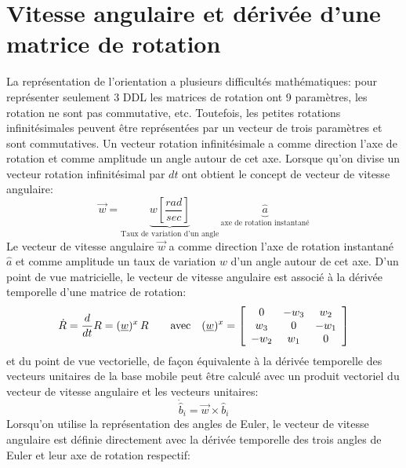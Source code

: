 \newpage
\section{Vitesse angulaire et dérivée d'une matrice de rotation}
\label{sec:angularspeed}

La représentation de l'orientation a plusieurs difficultés mathématiques: pour représenter seulement 3 DDL les matrices de rotation ont 9 paramètres, les rotation ne sont pas commutative, etc. Toutefois, les petites rotations infinitésimales peuvent être représentées par un vecteur de trois paramètres et sont commutatives. Un vecteur rotation infinitésimale a comme direction l'axe de rotation et comme amplitude un angle autour de cet axe. Lorsque qu'on divise un vecteur rotation infinitésimal par $dt$ ont obtient le concept de vecteur de vitesse angulaire:
\begin{equation}
\vec{w} = \underbrace{
w \left[ \frac{rad}{sec} \right] 
}_{\text{Taux de variation d'un angle}}
\,
\underbrace{
\hat{a}
}_{\text{axe de rotation instantané}}
\end{equation}
Le vecteur de vitesse angulaire $\vec{w}$ a comme direction l'axe de rotation instantané  $\hat{a}$ et comme amplitude un taux de variation $w$ d'un angle autour de cet axe. D'un point de vue matricielle, le vecteur de vitesse angulaire est associé à la dérivée temporelle d'une matrice de rotation:
\begin{equation}
\dot{R} = \frac{d}{dt} R = (\underline{w})^x \, R   \quad \quad \text{avec} \quad
(\underline{w})^x = 
\left[ \begin{array}{c c c}
0    & -w_3 & w_2 \\
w_3  & 0    & -w_1 \\
-w_2 & w_1  & 0 
\end{array}  \right]  
\end{equation}
et du point de vue vectorielle, de façon équivalente à la dérivée temporelle des vecteurs unitaires de la base mobile peut être calculé avec un produit vectoriel du vecteur de vitesse angulaire et les vecteurs unitaires:
\begin{equation}
\dot{\hat{b}}_i = \vec{w} \times \hat{b}_i
\end{equation}
 Lorsqu'on utilise la représentation des angles de Euler, le vecteur de vitesse angulaire est définie directement avec la dérivée temporelle des trois angles de Euler et leur axe de rotation respectif:
